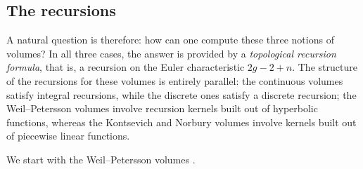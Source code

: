 \documentclass[a4paper,11pt,english]{article}
\theoremstyle{plain}
\theoremstyle{definition}
\theoremstyle{plain}
\begin{document}
\subsection{The recursions}
A natural question is therefore: how can one compute these three notions of volumes? In all three cases, the answer is provided by a \emph{topological recursion formula}, that is, a recursion on the Euler characteristic $2g - 2 + n$. The structure of the recursions for these volumes is entirely parallel: the continuous volumes satisfy integral recursions, while the discrete ones satisfy a discrete recursion; the Weil--Petersson volumes involve recursion kernels built out of hyperbolic functions, whereas the Kontsevich and Norbury volumes involve kernels built out of piecewise linear functions.

We start with the Weil--Petersson volumes \cite{Mir07a}.
\end{document}
